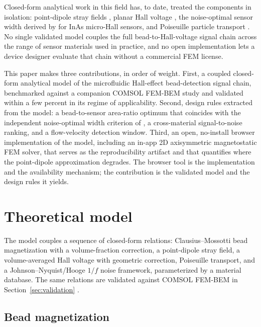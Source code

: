 \documentclass[pdflatex,sn-basic]{sn-jnl}
\theoremstyle{thmstyleone}
\theoremstyle{thmstyletwo}
\theoremstyle{thmstylethree}
\begin{document}
Closed-form analytical work in this field has, to date, treated the components in isolation: point-dipole stray fields \citep{griffiths}, planar Hall voltage \citep{popovic2004}, the noise-optimal sensor width derived by \citet{mihajlovic2007} for InAs micro-Hall sensors, and Poiseuille particle transport \citep{hewlin2023}. No single validated model couples the full bead-to-Hall-voltage signal chain across the range of sensor materials used in practice, and no open implementation lets a device designer evaluate that chain without a commercial FEM license.

This paper makes three contributions, in order of weight. First, a coupled closed-form analytical model of the microfluidic Hall-effect bead-detection signal chain, benchmarked against a companion COMSOL FEM-BEM study and validated within a few percent in its regime of applicability. Second, design rules extracted from the model: a bead-to-sensor area-ratio optimum that coincides with the independent noise-optimal width criterion of \citet{mihajlovic2007}, a cross-material signal-to-noise ranking, and a flow-velocity detection window. Third, an open, no-install browser implementation of the model, including an in-app 2D axisymmetric magnetostatic FEM solver, that serves as the reproducibility artifact and that quantifies where the point-dipole approximation degrades. The browser tool is the implementation and the availability mechanism; the contribution is the validated model and the design rules it yields.

\section{Theoretical model}\label{sec:theory}

The model couples a sequence of closed-form relations: Clausius--Mossotti bead magnetization with a volume-fraction correction, a point-dipole stray field, a volume-averaged Hall voltage with geometric correction, Poiseuille transport, and a Johnson--Nyquist/Hooge $1/f$ noise framework, parameterized by a material database. The same relations are validated against COMSOL FEM-BEM in Section~\ref{sec:validation} \citep{govindaraju2025}.

\subsection{Bead magnetization}\label{sec:magnetization}
\end{document}
